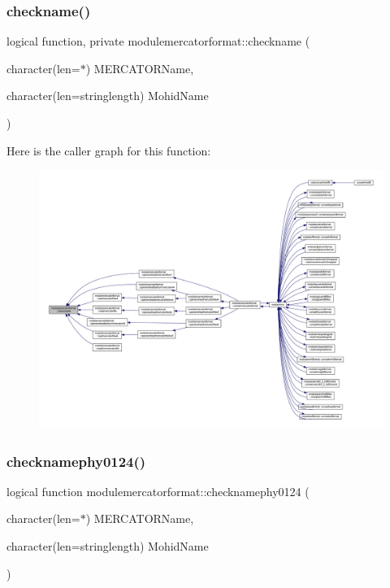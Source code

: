 \subsubsection{\texorpdfstring{checkname()}{checkname()}}
{\footnotesize\ttfamily logical function, private modulemercatorformat\+::checkname (\begin{DoxyParamCaption}\item[{character(len=$\ast$)}]{M\+E\+R\+C\+A\+T\+O\+R\+Name,  }\item[{character(len=stringlength)}]{Mohid\+Name }\end{DoxyParamCaption})\hspace{0.3cm}{\ttfamily [private]}}

Here is the caller graph for this function\+:\nopagebreak
\begin{figure}[H]
\begin{center}
\leavevmode
\includegraphics[width=350pt]{namespacemodulemercatorformat_a824858a27df60fc6f255443ee4ca7a96_icgraph}
\end{center}
\end{figure}
\mbox{\label{namespacemodulemercatorformat_a56d6a124d89d9acc9f4d378fbf3fc84f}} 
\subsubsection{\texorpdfstring{checknamephy0124()}{checknamephy0124()}}
{\footnotesize\ttfamily logical function modulemercatorformat\+::checknamephy0124 (\begin{DoxyParamCaption}\item[{character(len=$\ast$)}]{M\+E\+R\+C\+A\+T\+O\+R\+Name,  }\item[{character(len=stringlength)}]{Mohid\+Name }\end{DoxyParamCaption})\hspace{0.3cm}{\ttfamily [private]}}

